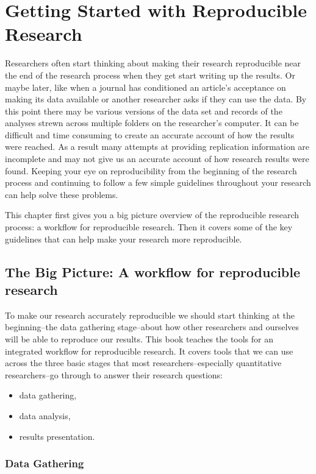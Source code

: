 \documentclass[ChapterTOCs,krantz1]{krantz}\usepackage{graphicx, color}
\begin{document}
\chapter{Getting Started with Reproducible Research}

Researchers often start thinking about making their research reproducible near the end of the research process when they get start writing up the results. Or maybe later, like when a journal has conditioned an article's acceptance on making its data available or another researcher asks if they can use the data. By this point there may be various versions of the data set and records of the analyses strewn across multiple folders on the researcher's computer. It can be difficult and time consuming to create an accurate account of how the results were reached. As a result many attempts at providing replication information are incomplete and may not give us an accurate account of how research results were found. Keeping your eye on reproducibility from the beginning of the research process and continuing to follow a few simple guidelines throughout your research can help solve these problems. 

This chapter first gives you a big picture overview of the reproducible research process: a workflow for reproducible research. Then it covers some of the key guidelines that can help make your research more reproducible.

\section{The Big Picture: A workflow for reproducible research}

To make our research accurately reproducible we should start thinking at the beginning--the data gathering stage--about how other researchers and ourselves will be able to reproduce our results. This book teaches the tools for an integrated workflow for reproducible research. It covers tools that we can use across the three basic stages that most researchers--especially quantitative researchers--go through to answer their research questions:

\begin{itemize}
    \item data gathering,
    \item data analysis,
    \item results presentation.
\end{itemize}

\subsection{Data Gathering}
\end{document}
